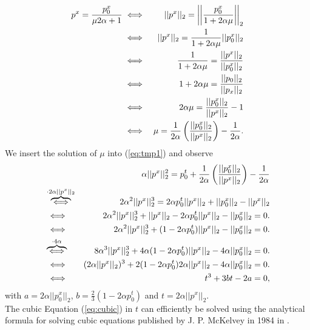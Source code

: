 \documentclass[abstracton]{scrreprt}
\begin{document}
\begin{enumerate}
\begin{eqnarray}
                        p^{x} = \frac{p_{0}^{x}}{\mu 2 \alpha + 1} &\iff& ||p^{x}||_{2} = \bigg|\bigg| \frac{p_{0}^{x}}{1 + 2 \alpha \mu} \bigg|\bigg|_{2} \notag \\
                        &\iff& ||p^{x}||_{2} = \frac{1}{1 + 2 \alpha \mu} ||p_{0}^{x}||_{2} \notag \\
                        &\iff& \frac{1}{1 + 2 \alpha \mu} = \frac{||p^{x}||_{2}}{||p_{0}^{x}||_{2}} \notag \\
                        &\iff& 1 + 2\alpha\mu = \frac{||p_{0}||_{2}}{||p_{x}||_{2}} \notag \\
                        &\iff& 2 \alpha \mu = \frac{||p_{0}^{x}||_{2}}{||p^{x}||_{2}} - 1 \notag \\
                        &\iff& \mu = \frac{1}{2 \alpha} \left( \frac{||p_{0}^{x}||_{2}}{||p^{x}||_{2}} \right) - \frac{1}{2\alpha}. \notag
                    \end{eqnarray}
                We insert the solution of $\mu$ into (\ref{eq:tmp1}) and observe
                    \begin{eqnarray}
                        &&\alpha ||p^{x}||_{2}^{2} = p_{0}^{t} + \frac{1}{2 \alpha} \left( \frac{||p_{0}^{x}||_{2}}{||p^{x}||_{2}} \right) - \frac{1}{2\alpha} \notag \\
                        &\overbrace{\iff}^{\cdot 2 \alpha ||p^{x}||_{2}}& 2 \alpha^{2} ||p^{x}||_{2}^{3} = 2 \alpha p_{0}^{t} ||p^{x}||_{2} + ||p_{0}^{x}||_{2} - ||p^{x}||_{2} \notag \\
                        &\iff& 2 \alpha^{2} ||p^{x}||_{2}^{3} + ||p^{x}||_{2} - 2\alpha p_{0}^{t} ||p^{x}||_{2} - ||p_{0}^{x}||_{2} = 0. \notag \\
                        &\iff& 2 \alpha^{2} ||p^{x}||_{2}^{3} + (1 - 2 \alpha p_{0}^{t}) ||p^{x}||_{2} - ||p_{0}^{x}||_{2} = 0. \notag \\
                        &\overbrace{\iff}^{\cdot 4 \alpha}& 8 \alpha^{3} ||p^{x}||_{2}^{3} + 4 \alpha (1 - 2 \alpha p_{0}^{t}) ||p^{x}||_{2} - 4 \alpha ||p_{0}^{x}||_{2} = 0. \notag \\
                        &\iff& (2 \alpha ||p^{x}||_{2})^{3} + 2 (1 - 2 \alpha p_{0}^{t}) 2 \alpha ||p^{x}||_{2} - 4 \alpha ||p_{0}^{x}||_{2} = 0. \notag \\
                        &\iff& t^{3} + 3bt - 2a = 0, \label{eq:cubic}
                    \end{eqnarray}
                with $a = 2 \alpha ||p_{0}^{x}||_{2}$, $b = \frac{2}{3}(1 - 2 \alpha p_{0}^{t})$ and $t = 2 \alpha ||p^{x}||_{2}$.\\
                The cubic Equation (\ref{eq:cubic}) in $t$ can efficiently be solved using the analytical formula for solving cubic equations published by J. P. McKelvey in 1984 in \cite{kelvey-ajp}.
            \end{enumerate}
\end{document}

